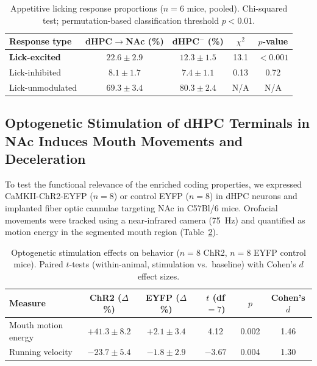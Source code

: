 \documentclass[11pt]{article}
\begin{document}
\begin{table}[htbp]
\centering
\caption{Appetitive licking response proportions ($n = 6$ mice, pooled). Chi-squared test; permutation-based classification threshold $p < 0.01$.}
\label{tab:lick}
\begin{tabular}{lcccc}
\toprule
\textbf{Response type} & \textbf{dHPC$\to$NAc (\%)} & \textbf{dHPC$^{-}$ (\%)} & \textbf{$\chi^2$} & \textbf{$p$-value} \\
\midrule
\textbf{Lick-excited} & $\mathbf{22.6 \pm 2.9}$ & $12.3 \pm 1.5$ & 13.1 & $<0.001$ \\
Lick-inhibited & $8.1 \pm 1.7$ & $7.4 \pm 1.1$ & 0.13 & 0.72 \\
Lick-unmodulated & $69.3 \pm 3.4$ & $80.3 \pm 2.4$ & N/A & N/A \\
\bottomrule
\end{tabular}
\end{table}

\subsection{Optogenetic Stimulation of dHPC Terminals in NAc Induces Mouth Movements and Deceleration}

To test the functional relevance of the enriched coding properties, we expressed CaMKII-ChR2-EYFP ($n = 8$) or control EYFP ($n = 8$) in dHPC neurons and implanted fiber optic cannulae targeting NAc in C57Bl/6 mice. Orofacial movements were tracked using a near-infrared camera (75~Hz) and quantified as motion energy in the segmented mouth region (Table~\ref{tab:opto}).

\begin{table}[htbp]
\centering
\caption{Optogenetic stimulation effects on behavior ($n = 8$ ChR2, $n = 8$ EYFP control mice). Paired $t$-tests (within-animal, stimulation vs.\ baseline) with Cohen's $d$ effect sizes.}
\label{tab:opto}
\begin{tabular}{lccccc}
\toprule
\textbf{Measure} & \textbf{ChR2 ($\Delta$\%)} & \textbf{EYFP ($\Delta$\%)} & \textbf{$t$ (df$=7$)} & \textbf{$p$} & \textbf{Cohen's $d$} \\
\midrule
Mouth motion energy & $+41.3 \pm 8.2$ & $+2.1 \pm 3.4$ & 4.12 & 0.002 & 1.46 \\
Running velocity & $-23.7 \pm 5.4$ & $-1.8 \pm 2.9$ & $-3.67$ & 0.004 & 1.30 \\
\bottomrule
\end{tabular}
\end{table}
\end{document}

